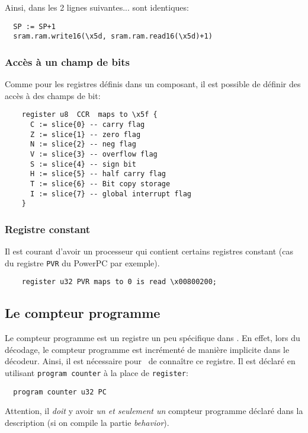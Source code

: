 Ainsi, dans les 2 lignes suivantes... sont identiques:
\begin{lstlisting}
  SP := SP+1
  sram.ram.write16(\x5d, sram.ram.read16(\x5d)+1)
\end{lstlisting}

\subsubsection{Accès à un champ de bits}
Comme pour les registres définis dans un composant, il est possible de définir des accès à des champs de bit:
\begin{lstlisting}
    register u8  CCR  maps to \x5f {
      C := slice{0} -- carry flag
      Z := slice{1} -- zero flag
      N := slice{2} -- neg flag
      V := slice{3} -- overflow flag
      S := slice{4} -- sign bit
      H := slice{5} -- half carry flag
      T := slice{6} -- Bit copy storage
      I := slice{7} -- global interrupt flag
    } 
\end{lstlisting}

\subsubsection{Registre constant}
Il est courant d'avoir un processeur qui contient certains registres constant (cas du registre \texttt{PVR} du PowerPC par exemple).
\begin{lstlisting}
    register u32 PVR maps to 0 is read \x00800200;
\end{lstlisting}

\subsection{Le compteur programme}
Le compteur programme est un registre un peu spécifique dans \harmless. En effet, lors du décodage, le compteur programme est incrémenté de manière implicite dans le décodeur. Ainsi, il est nécessaire pour \harmless\ de connaître ce registre. Il est déclaré en utilisant \texttt{program counter} à la place de \texttt{register}:
\begin{lstlisting}
  program counter u32 PC
\end{lstlisting}

Attention, il \emph{doit} y avoir \emph{un et seulement un} compteur programme déclaré dans la description (si on compile la partie \emph{behavior}).

